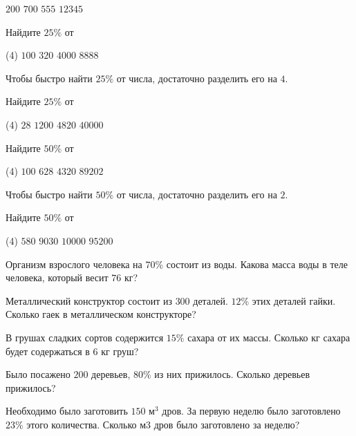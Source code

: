 \begin{class}[number=1]
\begin{listofex}[resume]
\begin{tasks}
			\task \( 200 \)
			\task \( 700 \)
			\task \( 555 \)
			\task \( 12345 \)
		\end{tasks}
		\item Найдите \( 25\% \) от
		\begin{tasks}(4)
			\task \( 100 \)
			\task \( 320 \)
			\task \( 4000 \)
			\task \( 8888 \)
		\end{tasks}
	\end{listofex}
		\begin{definit}
		Чтобы быстро найти \( 25\% \) от числа, достаточно разделить его на \( 4 \).
		\end{definit}	
	\begin{listofex}[resume]
		\item Найдите \( 25\% \) от
		\begin{tasks}(4)
			\task \( 28 \)
			\task \( 1200 \)
			\task \( 4820 \)
			\task \( 40000 \)
		\end{tasks}
		\item Найдите \( 50\% \) от
		\begin{tasks}(4)
			\task \( 100 \)
			\task \( 628 \)
			\task \( 4320 \)
			\task \( 89202 \)
		\end{tasks}
	\end{listofex}
		\begin{definit}
			Чтобы быстро найти \( 50\% \) от числа, достаточно разделить его на \( 2 \).
		\end{definit}
		\begin{listofex}[resume]
			\item Найдите \( 50\% \) от
			\begin{tasks}(4)
				\task \( 580 \)
				\task \( 9030 \)
				\task \( 10000 \)
				\task \( 95200 \)
			\end{tasks}
			\item Организм взрослого человека на \( 70\% \) состоит из воды. Какова масса воды в теле человека, который весит \( 76 \) кг?
			\item Металлический конструктор состоит из \( 300 \) деталей. \( 12\% \) этих деталей гайки. Сколько гаек в металлическом конструкторе?
			\item В грушах сладких сортов содержится \( 15\% \) сахара от их массы. Сколько кг сахара будет содержаться в \( 6 \) кг груш?
			\item Было посажено \( 200 \) деревьев, \( 80\% \) из них прижилось. Сколько деревьев прижилось?
			\item Необходимо было заготовить \( 150 \) м\( ^3 \) дров. За первую неделю было заготовлено \( 23\% \) этого количества. Сколько м3 дров было заготовлено за неделю?
		\end{listofex}
\end{class}

